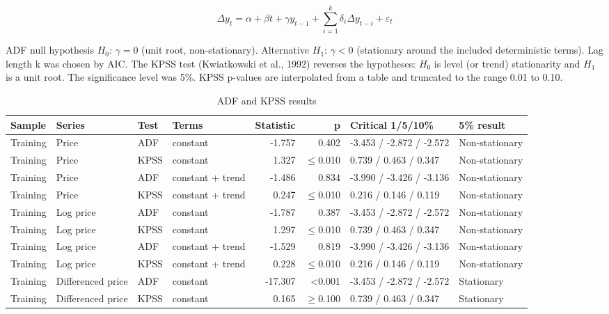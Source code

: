 \documentclass[11pt,a4paper]{article}
\begin{document}
\begin{equation}
\Delta y_t=\alpha+\beta t+\gamma y_{t-1}+\sum_{i=1}^{k}\delta_i\Delta y_{t-i}+\varepsilon_t
\end{equation}

ADF null hypothesis $H_0$: $\gamma = 0$ (unit root, non-stationary). Alternative $H_1$: $\gamma < 0$ (stationary around the included deterministic terms). Lag length k was chosen by AIC. The KPSS test (Kwiatkowski et al., 1992) reverses the hypotheses: $H_0$ is level (or trend) stationarity and $H_1$ is a unit root. The significance level was 5\%. KPSS p-values are interpolated from a table and truncated to the range 0.01 to 0.10.

\begin{table}[H]
\centering
\caption{ADF and KPSS results}
\footnotesize
\setlength{\tabcolsep}{4pt}
\begin{adjustbox}{max width=\linewidth}
\begin{tabular}{llllrrll}
\toprule
\textbf{Sample} & \textbf{Series} & \textbf{Test} & \textbf{Terms} & \textbf{Statistic} & \textbf{p} & \textbf{Critical 1/5/10\%} & \textbf{5\% result} \\
\midrule
Training & Price & ADF & constant & -1.757 & 0.402 & -3.453 / -2.872 / -2.572 & Non-stationary \\
Training & Price & KPSS & constant & 1.327 & $\le$0.010 & 0.739 / 0.463 / 0.347 & Non-stationary \\
Training & Price & ADF & constant + trend & -1.486 & 0.834 & -3.990 / -3.426 / -3.136 & Non-stationary \\
Training & Price & KPSS & constant + trend & 0.247 & $\le$0.010 & 0.216 / 0.146 / 0.119 & Non-stationary \\
Training & Log price & ADF & constant & -1.787 & 0.387 & -3.453 / -2.872 / -2.572 & Non-stationary \\
Training & Log price & KPSS & constant & 1.297 & $\le$0.010 & 0.739 / 0.463 / 0.347 & Non-stationary \\
Training & Log price & ADF & constant + trend & -1.529 & 0.819 & -3.990 / -3.426 / -3.136 & Non-stationary \\
Training & Log price & KPSS & constant + trend & 0.228 & $\le$0.010 & 0.216 / 0.146 / 0.119 & Non-stationary \\
Training & Differenced price & ADF & constant & -17.307 & \textless{}0.001 & -3.453 / -2.872 / -2.572 & Stationary \\
Training & Differenced price & KPSS & constant & 0.165 & $\ge$0.100 & 0.739 / 0.463 / 0.347 & Stationary \\

\end{tabular}
\end{adjustbox}
\end{table}
\end{document}
